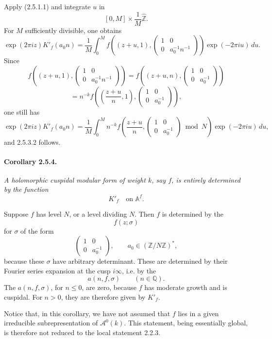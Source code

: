 \documentclass[10pt,a4paper]{article}
\providecommand{\Q}{\mathbb Q}
\providecommand{\Z}{\mathbb Z}
\providecommand{\Af}{\mathbb A^f}
\begin{document}
Apply (2.5.1.1) and integrate \(u\) in
\[
[0,M]\times \frac1M\widehat{\Z}.
\]
For \(M\) sufficiently divisible, one obtains
\[
\exp(2\pi iz)K'_f(a_0n)
=
\frac1M\int_0^M
f\!\left((z+u,1),
\begin{pmatrix}1&0\\0&a_0^{-1}n^{-1}\end{pmatrix}\right)
\exp(-2\pi iu)\,du.
\]
Since
\[
f\!\left((z+u,1),
\begin{pmatrix}1&0\\0&a_0^{-1}n^{-1}\end{pmatrix}\right)
=
f\!\left((z+u,n),
\begin{pmatrix}1&0\\0&a_0^{-1}\end{pmatrix}\right)
\]
\[
=
n^{-k}
f\!\left(\left(\frac{z+u}{n},1\right),
\begin{pmatrix}1&0\\0&a_0^{-1}\end{pmatrix}\right),
\]
one still has
\[
\exp(2\pi iz)K'_f(a_0n)
=
\frac1M\int_0^M
n^{-k}f\!\left(\frac{z+u}{n},
\begin{pmatrix}1&0\\0&a_0^{-1}\end{pmatrix}\bmod N\right)
\exp(-2\pi iu)\,du,
\]
and 2.5.3.2 follows.

\paragraph{Corollary 2.5.4.}{\itshape  A holomorphic cuspidal modular form of weight \(k\), say \(f\), is entirely determined by the function
\[
K'_f\quad\text{on }\Af.
\]\par}

Suppose \(f\) has level \(N\), or a level dividing \(N\). Then \(f\) is determined by the
\[
f(z;\sigma)
\]
for \(\sigma\) of the form
\[
\begin{pmatrix}1&0\\0&a_0^{-1}\end{pmatrix},
\qquad
a_0\in(\Z/N\Z)^*,
\]
because these \(\sigma\) have arbitrary determinant. These are determined by their Fourier series expansion at the cusp \(i\infty\), i.e. by the
\[
a(n,f,\sigma)\qquad(n\in\Q).
\]
The \(a(n,f,\sigma)\), for \(n\le0\), are zero, because \(f\) has moderate growth and is cuspidal. For \(n>0\), they are therefore given by \(K'_f\).

Notice that, in this corollary, we have not assumed that \(f\) lies in a given irreducible subrepresentation of \(\mathcal A^0(k)\). This statement, being essentially global, is therefore not reduced to the local statement 2.2.3.
\end{document}
